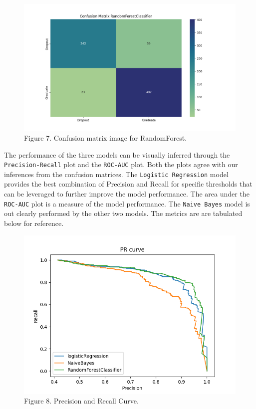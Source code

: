 \documentclass[
]{article}
\begin{document}
\begin{figure}
\includegraphics[width=1\linewidth]{../results/Confusion_Matrix_RandomForestClassifier} \caption{Figure 7. Confusion matrix image for RandomForest.}\label{fig:Confusion_Matrix_RandomForestClassifier}
\end{figure}

The performance of the three models can be visually inferred through the
\texttt{Precision-Recall} plot and the \texttt{ROC-AUC} plot. Both the
plots agree with our inferences from the confusion matrices. The
\texttt{Logistic\ Regression} model provides the best combination of
Precision and Recall for specific thresholds that can be leveraged to
further improve the model performance. The area under the
\texttt{ROC-AUC} plot is a measure of the model performance. The
\texttt{Naive\ Bayes} model is out clearly performed by the other two
models. The metrics are are tabulated below for reference.

\begin{figure}
\includegraphics[width=1\linewidth]{../results/PR_curve} \caption{Figure 8. Precision and Recall Curve.}\label{fig:PR_curve}
\end{figure}
\end{document}

